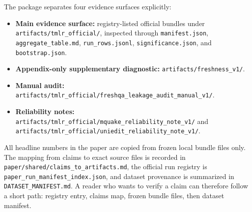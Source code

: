 The package separates four evidence surfaces explicitly:
\begin{itemize}[leftmargin=1.5em]
\item \textbf{Main evidence surface:} registry-listed official bundles under \texttt{artifacts/tmlr\_official/}, inspected through \texttt{manifest.json}, \texttt{aggregate\_table.md}, \texttt{run\_rows.jsonl}, \texttt{significance.json}, and \texttt{bootstrap.json}.
\item \textbf{Appendix-only supplementary diagnostic:} \texttt{artifacts/freshness\_v1/}.
\item \textbf{Manual audit:} \texttt{artifacts/tmlr\_official/freshqa\_leakage\_audit\_manual\_v1/}.
\item \textbf{Reliability notes:} \texttt{artifacts/tmlr\_official/mquake\_reliability\_note\_v1/} and \texttt{artifacts/tmlr\_official/uniedit\_reliability\_note\_v1/}.
\end{itemize}

All headline numbers in the paper are copied from frozen local bundle files only. The mapping from claims to exact source files is recorded in \texttt{paper/shared/claims\_to\_artifacts.md}, the official run registry is \texttt{paper\_run\_manifest\_index.json}, and dataset provenance is summarized in \texttt{DATASET\_MANIFEST.md}. A reader who wants to verify a claim can therefore follow a short path: registry entry, claims map, frozen bundle files, then dataset manifest.
